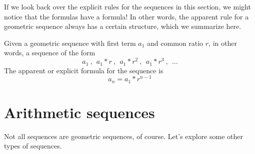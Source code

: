 If we look back over the explicit rules for the sequences in this section, we might notice that the formulas have a formula! In other words, the apparent rule for a geometric sequence always has a certain structure, which we summarize here.

\begin{boxeddef}
Given a geometric sequence with first term $a_1$ and common ratio $r$, in other words, a sequence of the form \[a_1~,~~ a_1\ast r~,~~ a_1\ast r^2~,~~ a_1\ast r^3~,~~ \dotsc\]
The apparent or explicit formula for the sequence is \[a_n = a_1\ast r^{n-1}\]
\end{boxeddef}


\section{Arithmetic sequences}
\label{sec:arithmeticseq}

Not all sequences are geometric sequences, of course. Let's explore some other types of sequences.

\begin{boxedexplore}
\end{boxedexplore}

